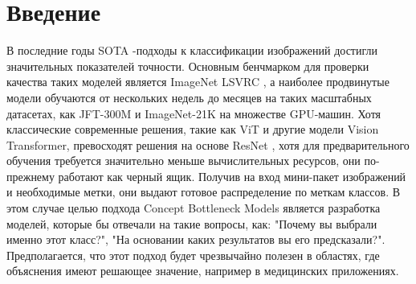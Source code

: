 \newpage


\section{Введение}
\label{submission}

В последние годы SOTA \cite{yu2023noisynn}-подходы к классификации изображений достигли значительных показателей точности. Основным бенчмарком для проверки качества таких моделей является ImageNet LSVRC \cite{russakovsky2015imagenet}, а наиболее продвинутые модели обучаются от нескольких недель до месяцев на таких масштабных датасетах, как JFT-300M \cite{sun2017revisiting} и ImageNet-21K \cite{5206848} на множестве GPU-машин. Хотя классические современные решения, такие как ViT \cite{dosovitskiy2021image} и другие модели Vision Transformer, превосходят решения на основе ResNet \cite{he2015deep}, хотя для предварительного обучения требуется значительно меньше вычислительных ресурсов, они по-прежнему работают как черный ящик. Получив на вход мини-пакет изображений и необходимые метки, они выдают готовое распределение по меткам классов. В этом случае целью подхода Concept Bottleneck Models \cite{koh2020concept} является разработка моделей, которые бы отвечали на такие вопросы, как: "Почему вы выбрали именно этот класс?", "На основании каких результатов вы его предсказали?". Предполагается, что этот подход будет чрезвычайно полезен в областях, где объяснения имеют решающее значение, например в медицинских приложениях. 

